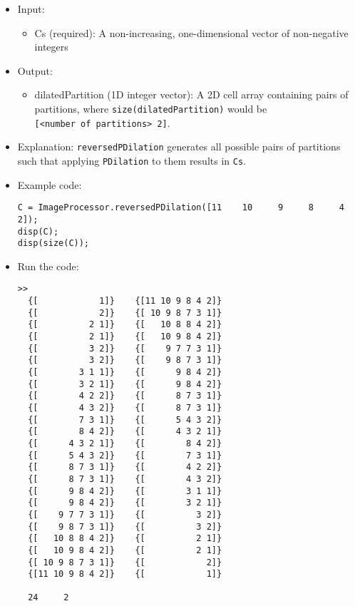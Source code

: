 \documentclass[11pt]{amsart}
\theoremstyle{remark}
\providecommand{\tightlist}{%
  \setlength{\itemsep}{0pt}\setlength{\parskip}{0pt}}
\theoremstyle{definition}
\theoremstyle{remark}
\numberwithin{equation}{section}
\begin{document}
\begin{itemize}
\item
  Input:

  \begin{itemize}
  \tightlist
  \item
    Cs (required): A non-increasing, one-dimensional vector of
    non-negative integers\\
  \end{itemize}
\item
  Output:

  \begin{itemize}
  \tightlist
  \item
    dilatedPartition (1D integer vector): A 2D cell array containing
    pairs of partitions, where \texttt{size(dilatedPartition)} would be
    \texttt{{[}\textless{}number\ of\ partitions\textgreater{}\ 2{]}}.
  \end{itemize}
\item
  Explanation: \texttt{reversedPDilation} generates all possible pairs
  of partitions such that applying \texttt{PDilation} to them results in
  \texttt{Cs}.
\item
  Example code:

\begin{verbatim}
C = ImageProcessor.reversedPDilation([11    10     9     8     4     2]);
disp(C);
disp(size(C));
\end{verbatim}
\item
  Run the code:

\begin{verbatim}
>>
  {[            1]}    {[11 10 9 8 4 2]}
  {[            2]}    {[ 10 9 8 7 3 1]}
  {[          2 1]}    {[   10 8 8 4 2]}
  {[          2 1]}    {[   10 9 8 4 2]}
  {[          3 2]}    {[    9 7 7 3 1]}
  {[          3 2]}    {[    9 8 7 3 1]}
  {[        3 1 1]}    {[      9 8 4 2]}
  {[        3 2 1]}    {[      9 8 4 2]}
  {[        4 2 2]}    {[      8 7 3 1]}
  {[        4 3 2]}    {[      8 7 3 1]}
  {[        7 3 1]}    {[      5 4 3 2]}
  {[        8 4 2]}    {[      4 3 2 1]}
  {[      4 3 2 1]}    {[        8 4 2]}
  {[      5 4 3 2]}    {[        7 3 1]}
  {[      8 7 3 1]}    {[        4 2 2]}
  {[      8 7 3 1]}    {[        4 3 2]}
  {[      9 8 4 2]}    {[        3 1 1]}
  {[      9 8 4 2]}    {[        3 2 1]}
  {[    9 7 7 3 1]}    {[          3 2]}
  {[    9 8 7 3 1]}    {[          3 2]}
  {[   10 8 8 4 2]}    {[          2 1]}
  {[   10 9 8 4 2]}    {[          2 1]}
  {[ 10 9 8 7 3 1]}    {[            2]}
  {[11 10 9 8 4 2]}    {[            1]}

  24     2
\end{verbatim}
\end{itemize}
\end{document}
